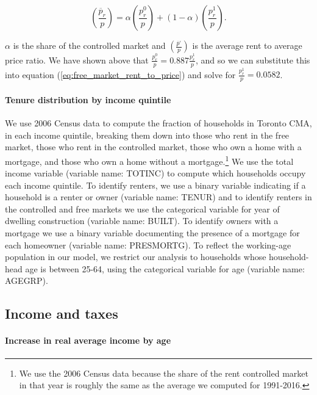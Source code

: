 \documentclass[parskip=full]{article}
\begin{document}
\begin{equation}\label{eq:free_market_rent_to_price}
    {\left(\frac{\overline{p}_{r}}{p}\right)}=\alpha \left(\frac{p^{0}_{r}}{p}\right)+(1-\alpha) \left(\frac{p^{1}_{r}}{p}\right).
\end{equation}

\noindent $\alpha$ is the share of the controlled market and ${\left(\frac{\overline{p}^_{r}}{p}\right)}$ is the average rent to average price ratio. We have shown above that $\frac{p^{0}_{r}}{p}=0.887\frac{p^{1}_{r}}{p}$, and so we can substitute this into equation (\ref{eq:free_market_rent_to_price}) and solve for $\frac{p^{1}_{r}}{p}=0.0582$.

\paragraph{Tenure distribution by income quintile}

We use 2006 Census data to compute the fraction of households in Toronto CMA, in each income quintile, breaking them down into those who rent in the free market, those who rent in the controlled market, those who own a home with a mortgage, and those who own a home without a mortgage.\footnote{We use the 2006 Census data because the share of the rent controlled market in that year is roughly the same as the average we computed for 1991-2016.} We use the total income variable (variable name: TOTINC) to compute which households occupy each income quintile. To identify renters, we use a  binary variable indicating if a household is a renter or owner (variable name: TENUR) and to identify renters in the controlled and free markets we use the categorical variable for year of dwelling construction (variable name: BUILT). To identify owners with a mortgage we use a binary variable documenting the presence of a mortgage for each homeowner (variable name: PRESMORTG). To reflect the working-age population in our model, we restrict our analysis to households whose household-head age is between 25-64, using the categorical variable for age (variable name: AGEGRP). 

\subsection{Income and taxes}

\paragraph{Increase in real average income by age}
\end{document}
